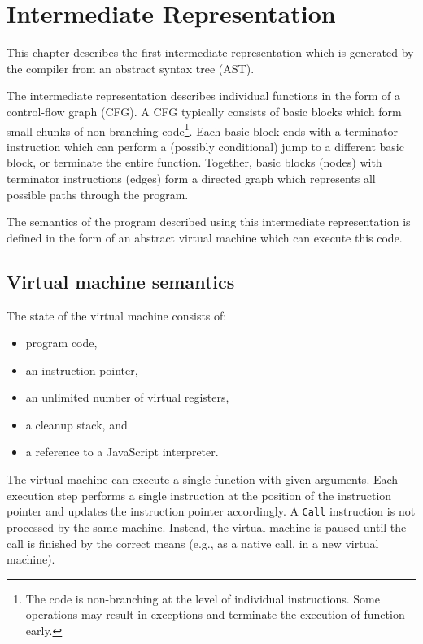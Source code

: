 \chapter{Intermediate Representation}\label{ir}

This chapter describes the first intermediate representation which is generated by the compiler from an abstract syntax tree (AST).

The intermediate representation describes individual functions in the form of a control-flow graph (CFG). A CFG typically consists of basic blocks which form small chunks of non-branching code\footnote{The code is non-branching at the level of individual instructions. Some operations may result in exceptions and terminate the execution of function early.}. Each basic block ends with a terminator instruction which can perform a (possibly conditional) jump to a different basic block, or terminate the entire function. Together, basic blocks (nodes) with terminator instructions (edges) form a directed graph which represents all possible paths through the program.

The semantics of the program described using this intermediate representation is defined in the form of an abstract virtual machine which can execute this code.


\section{Virtual machine semantics}

The state of the virtual machine consists of:
\begin{itemize}
    \item program code,
    \item an instruction pointer,
    \item an unlimited number of virtual registers,
    \item a cleanup stack, and
    \item a reference to a JavaScript interpreter.
\end{itemize}

The virtual machine can execute a single function with given arguments. Each execution step performs a single instruction at the position of the instruction pointer and updates the instruction pointer accordingly. A \texttt{Call} instruction is not processed by the same machine. Instead, the virtual machine is paused until the call is finished by the correct means (e.g., as a native call, in a new virtual machine).

